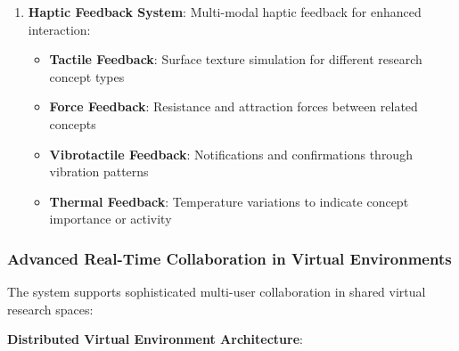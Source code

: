 \documentclass[10pt,twocolumn]{article}
\begin{document}
\begin{enumerate}
    \item \textbf{Haptic Feedback System}: Multi-modal haptic feedback for enhanced interaction:
    \begin{itemize}
        \item \textbf{Tactile Feedback}: Surface texture simulation for different research concept types
        \item \textbf{Force Feedback}: Resistance and attraction forces between related concepts
        \item \textbf{Vibrotactile Feedback}: Notifications and confirmations through vibration patterns
        \item \textbf{Thermal Feedback}: Temperature variations to indicate concept importance or activity
    \end{itemize}
\end{enumerate}

\subsubsection{Advanced Real-Time Collaboration in Virtual Environments}

The system supports sophisticated multi-user collaboration in shared virtual research spaces:

\textbf{Distributed Virtual Environment Architecture}:
\end{document}
